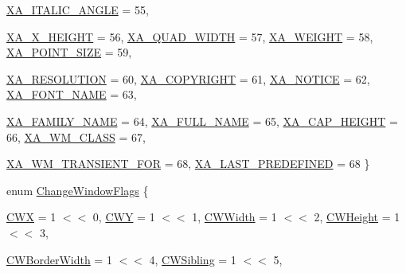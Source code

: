 \begin{DoxyCompactItemize}
\hyperlink{namespace_tao_1_1_platform_1_1_x11_a9042a68c2a3fd29002b5ad9d26f5776a}{XA\_\-ITALIC\_\-ANGLE} =  55, 
\par
\hyperlink{namespace_tao_1_1_platform_1_1_x11_a9042a68c2a3fd29002b5ad9d26f5776a}{XA\_\-X\_\-HEIGHT} =  56, 
\hyperlink{namespace_tao_1_1_platform_1_1_x11_a9042a68c2a3fd29002b5ad9d26f5776a}{XA\_\-QUAD\_\-WIDTH} =  57, 
\hyperlink{namespace_tao_1_1_platform_1_1_x11_a9042a68c2a3fd29002b5ad9d26f5776a}{XA\_\-WEIGHT} =  58, 
\hyperlink{namespace_tao_1_1_platform_1_1_x11_a9042a68c2a3fd29002b5ad9d26f5776a}{XA\_\-POINT\_\-SIZE} =  59, 
\par
\hyperlink{namespace_tao_1_1_platform_1_1_x11_a9042a68c2a3fd29002b5ad9d26f5776a}{XA\_\-RESOLUTION} =  60, 
\hyperlink{namespace_tao_1_1_platform_1_1_x11_a9042a68c2a3fd29002b5ad9d26f5776a}{XA\_\-COPYRIGHT} =  61, 
\hyperlink{namespace_tao_1_1_platform_1_1_x11_a9042a68c2a3fd29002b5ad9d26f5776a}{XA\_\-NOTICE} =  62, 
\hyperlink{namespace_tao_1_1_platform_1_1_x11_a9042a68c2a3fd29002b5ad9d26f5776a}{XA\_\-FONT\_\-NAME} =  63, 
\par
\hyperlink{namespace_tao_1_1_platform_1_1_x11_a9042a68c2a3fd29002b5ad9d26f5776a}{XA\_\-FAMILY\_\-NAME} =  64, 
\hyperlink{namespace_tao_1_1_platform_1_1_x11_a9042a68c2a3fd29002b5ad9d26f5776a}{XA\_\-FULL\_\-NAME} =  65, 
\hyperlink{namespace_tao_1_1_platform_1_1_x11_a9042a68c2a3fd29002b5ad9d26f5776a}{XA\_\-CAP\_\-HEIGHT} =  66, 
\hyperlink{namespace_tao_1_1_platform_1_1_x11_a9042a68c2a3fd29002b5ad9d26f5776a}{XA\_\-WM\_\-CLASS} =  67, 
\par
\hyperlink{namespace_tao_1_1_platform_1_1_x11_a9042a68c2a3fd29002b5ad9d26f5776a}{XA\_\-WM\_\-TRANSIENT\_\-FOR} =  68, 
\hyperlink{namespace_tao_1_1_platform_1_1_x11_a9042a68c2a3fd29002b5ad9d26f5776a}{XA\_\-LAST\_\-PREDEFINED} =  68
 \}
\item 
enum \hyperlink{namespace_tao_1_1_platform_1_1_x11_a1629b5fbafa3ee7f6e35e1073b1416a0}{ChangeWindowFlags} \{ \par
\hyperlink{namespace_tao_1_1_platform_1_1_x11_a1629b5fbafa3ee7f6e35e1073b1416a0}{CWX} =  1 $<$$<$ 0, 
\hyperlink{namespace_tao_1_1_platform_1_1_x11_a1629b5fbafa3ee7f6e35e1073b1416a0}{CWY} =  1 $<$$<$ 1, 
\hyperlink{namespace_tao_1_1_platform_1_1_x11_a1629b5fbafa3ee7f6e35e1073b1416a0}{CWWidth} =  1 $<$$<$ 2, 
\hyperlink{namespace_tao_1_1_platform_1_1_x11_a1629b5fbafa3ee7f6e35e1073b1416a0}{CWHeight} =  1 $<$$<$ 3, 
\par
\hyperlink{namespace_tao_1_1_platform_1_1_x11_a1629b5fbafa3ee7f6e35e1073b1416a0}{CWBorderWidth} =  1 $<$$<$ 4, 
\hyperlink{namespace_tao_1_1_platform_1_1_x11_a1629b5fbafa3ee7f6e35e1073b1416a0}{CWSibling} =  1 $<$$<$ 5, 

\end{DoxyCompactItemize}
